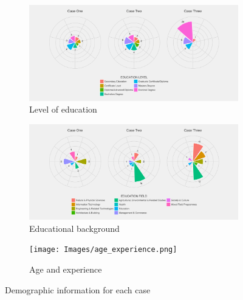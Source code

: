 \begin{figure}
    \centering
    \begin{subfigure}[b]{1\textwidth}
        \includegraphics[width=1\linewidth]{Images/ed_level.png}
        \caption{Level of education}
        \label{fig:edlevel}
    \end{subfigure} \medskip
    
    \begin{subfigure}[b]{1\textwidth}
        \includegraphics[width=1\linewidth]{Images/ed_field.png}
        \caption{Educational background}
        \label{fig:edfield}
    \end{subfigure} \medskip
 
    \begin{subfigure}[b]{1\textwidth}
        \texttt{[image: Images/age\_experience.png]}
        \caption{Age and experience}
        \label{fig:years}
    \end{subfigure}
    \caption{Demographic information for each case}\label{fig:demographics}
\end{figure}

